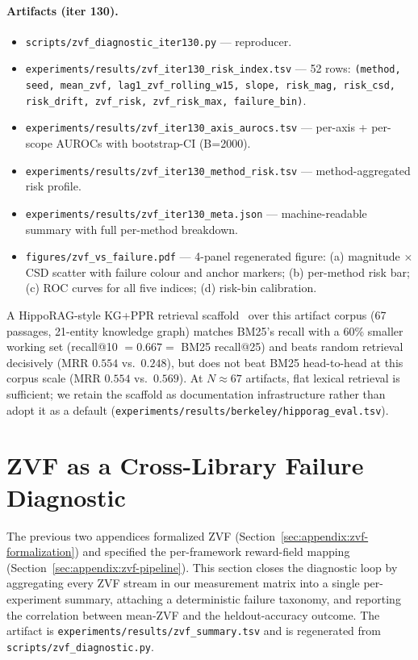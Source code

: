 \documentclass{article}
\begin{document}
\paragraph{Artifacts (iter 130).}
\begin{itemize}
\item \texttt{scripts/zvf\_diagnostic\_iter130.py} --- reproducer.
\item \texttt{experiments/results/zvf\_iter130\_risk\_index.tsv} ---
52 rows: \texttt{(method, seed, mean\_zvf, lag1\_zvf\_rolling\_w15,
slope, risk\_mag, risk\_csd, risk\_drift, zvf\_risk, zvf\_risk\_max,
failure\_bin)}.
\item \texttt{experiments/results/zvf\_iter130\_axis\_aurocs.tsv} ---
per-axis + per-scope AUROCs with bootstrap-CI (B=2000).
\item \texttt{experiments/results/zvf\_iter130\_method\_risk.tsv} ---
method-aggregated risk profile.
\item \texttt{experiments/results/zvf\_iter130\_meta.json} ---
machine-readable summary with full per-method breakdown.
\item \texttt{figures/zvf\_vs\_failure.pdf} --- 4-panel
regenerated figure: (a) magnitude $\times$ CSD scatter with failure
colour and anchor markers; (b) per-method risk bar; (c) ROC curves
for all five indices; (d) risk-bin calibration.
\end{itemize}

A HippoRAG-style KG+PPR retrieval scaffold~\citep{gutierrez2024hipporag}
over this artifact corpus (67 passages, 21-entity knowledge graph)
matches BM25's recall with a 60\% smaller working set
(recall@10 $= 0.667 =$ BM25 recall@25) and beats random retrieval
decisively (MRR $0.554$ vs.\ $0.248$), but does not beat BM25
head-to-head at this corpus scale (MRR $0.554$ vs.\ $0.569$). At
$N \approx 67$ artifacts, flat lexical retrieval is sufficient; we
retain the scaffold as documentation infrastructure rather than adopt
it as a default
(\texttt{experiments/results/berkeley/hipporag\_eval.tsv}).
 

\section{ZVF as a Cross-Library Failure Diagnostic}
\label{sec:zvf-cross-experiment}

The previous two appendices formalized ZVF
(Section~\ref{sec:appendix:zvf-formalization}) and specified the
per-framework reward-field mapping
(Section~\ref{sec:appendix:zvf-pipeline}). This section closes the
diagnostic loop by aggregating every ZVF stream in our measurement
matrix into a single per-experiment summary, attaching a deterministic
failure taxonomy, and reporting the correlation between mean-ZVF and
the heldout-accuracy outcome. The artifact is
\texttt{experiments/results/zvf\_summary.tsv} and is regenerated from
\texttt{scripts/zvf\_diagnostic.py}.
\end{document}

